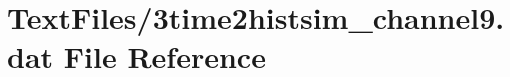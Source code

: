 \hypertarget{3time2histsim__channel9_8dat}{}\section{Text\+Files/3time2histsim\+\_\+channel9.dat File Reference}
\label{3time2histsim__channel9_8dat}
